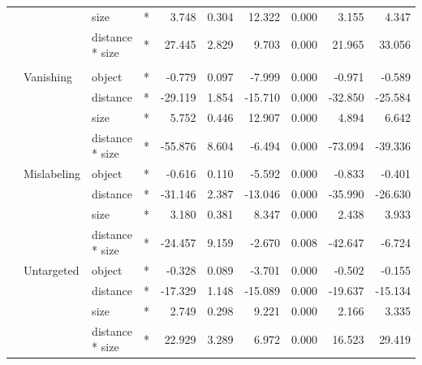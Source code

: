 \begin{longtable}[t]{llllrrrrrr}
\cmidrule{3-10}\nopagebreak
\hspace{1em} &  & size & * & 3.748 & 0.304 & 12.322 & 0.000 & 3.155 & 4.347\\
\cmidrule{3-10}\nopagebreak
\hspace{1em} &  & distance * size & * & 27.445 & 2.829 & 9.703 & 0.000 & 21.965 & 33.056\\
\cmidrule{1-10}\pagebreak[0]
\addlinespace[0.3em]
\multicolumn{10}{l}{\textbf{Cascade R-CNN}}\\
\hspace{1em} & Vanishing & object & * & -0.779 & 0.097 & -7.999 & 0.000 & -0.971 & -0.589\\
\cmidrule{3-10}\nopagebreak
\hspace{1em} &  & distance & * & -29.119 & 1.854 & -15.710 & 0.000 & -32.850 & -25.584\\
\cmidrule{3-10}\nopagebreak
\hspace{1em} &  & size & * & 5.752 & 0.446 & 12.907 & 0.000 & 4.894 & 6.642\\
\cmidrule{3-10}\nopagebreak
\hspace{1em} &  & distance * size & * & -55.876 & 8.604 & -6.494 & 0.000 & -73.094 & -39.336\\
\cmidrule{2-10}\nopagebreak
\hspace{1em} & Mislabeling & object & * & -0.616 & 0.110 & -5.592 & 0.000 & -0.833 & -0.401\\
\cmidrule{3-10}\nopagebreak
\hspace{1em} &  & distance & * & -31.146 & 2.387 & -13.046 & 0.000 & -35.990 & -26.630\\
\cmidrule{3-10}\nopagebreak
\hspace{1em} &  & size & * & 3.180 & 0.381 & 8.347 & 0.000 & 2.438 & 3.933\\
\cmidrule{3-10}\nopagebreak
\hspace{1em} &  & distance * size & * & -24.457 & 9.159 & -2.670 & 0.008 & -42.647 & -6.724\\
\cmidrule{2-10}\nopagebreak
\hspace{1em} & Untargeted & object & * & -0.328 & 0.089 & -3.701 & 0.000 & -0.502 & -0.155\\
\cmidrule{3-10}\nopagebreak
\hspace{1em} &  & distance & * & -17.329 & 1.148 & -15.089 & 0.000 & -19.637 & -15.134\\
\cmidrule{3-10}\nopagebreak
\hspace{1em} &  & size & * & 2.749 & 0.298 & 9.221 & 0.000 & 2.166 & 3.335\\
\cmidrule{3-10}\nopagebreak
\hspace{1em} &  & distance * size & * & 22.929 & 3.289 & 6.972 & 0.000 & 16.523 & 29.419\\
\bottomrule
\end{longtable}
\endgroup{}

